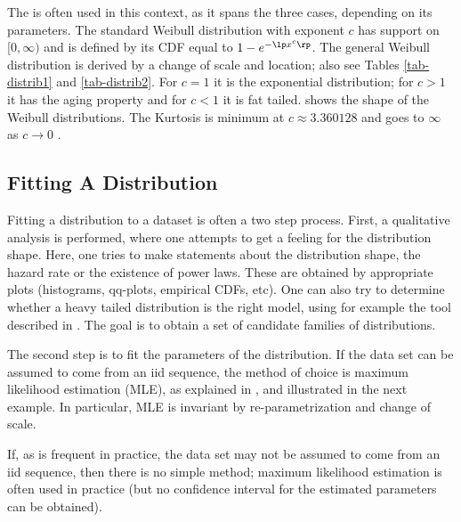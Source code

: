 The \label{def-weibull} is often used
in this context, as it spans the three cases, depending on its
parameters. The standard Weibull distribution with exponent $c$
has support on $[0,\infty ) $ and is defined by its CDF equal
to $1-e^{-\lp  x ^c \rp}$. The general Weibull distribution is
derived by a change of scale and location; also see Tables
\ref{tab-distrib1} and \ref{tab-distrib2}. For $c=1$ it is the
exponential distribution; for $c>1$ it has the aging property
and for $c<1$ it is fat tailed.  shows the
shape of the Weibull distributions. The Kurtosis is minimum at
$c\approx 3.360128$  and goes to $\infty$ as $c\to 0$
\cite{rinne2008weibull}.
\begin{figure}[htbp]
\end{figure}


\subsection{Fitting A Distribution}

Fitting a distribution to a dataset is often a two step
process. First, a qualitative analysis is performed, where one
attempts to get a feeling for the distribution shape. Here, one tries to make statements
about the distribution shape, the hazard rate or the existence
of power laws. These are obtained by appropriate plots
(histograms, qq-plots, empirical CDFs, etc). One can also try
to determine whether a heavy tailed distribution is the right
model, using for example the  tool described in
. The goal is to obtain a set of candidate
families of distributions.

The second step is to fit the parameters of the
distribution. If the data set can be assumed to
come from an iid sequence, the method of choice
is maximum likelihood estimation (MLE), as
explained in , and
illustrated in the next example. In particular,
MLE is invariant by re-parametrization and change
of scale.

If, as is frequent in practice, the data set may
not be assumed to come from an iid sequence, then
there is no simple method; maximum likelihood
estimation is often used in practice (but no
confidence interval for the estimated parameters
can be obtained).

